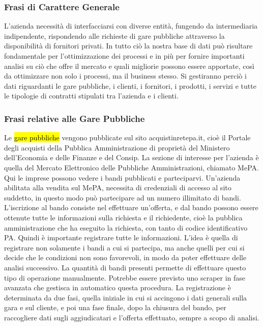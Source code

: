 
\subsubsection{Frasi di Carattere Generale}
L'azienda necessità di interfacciarsi con diverse entità, fungendo da intermediaria indipendente, rispondendo alle richieste di gare pubbliche attraverso la disponibilità di fornitori privati. In tutto ciò la nostra base di dati può risultare fondamentale per l'ottimizzazione dei processi e in più per fornire importanti analisi su ciò che offre il mercato e quali migliorie possono essere apportate, così da ottimizzare non solo i processi, ma il business stesso.\newline
Si gestiranno perciò i dati riguardanti le gare pubbliche, i clienti, i fornitori, i prodotti, i servizi e tutte le tipologie di contratti stipulati tra l'azienda e i clienti.

\subsubsection{Frasi relative alle Gare Pubbliche}
Le \hl{gare pubbliche} vengono pubblicate sul sito acquistinretepa.it, cioè il Portale degli acquisti della Pubblica Amministrazione di proprietà del Ministero dell'Economia e delle Finanze e del Consip.\newline
La sezione di interesse per l'azienda è quella del Mercato Elettronico delle Pubbliche Amministrazioni, chiamato MePA. Qui le imprese possono vedere i bandi pubblicati e parteciparvi.\newline
Un'azienda abilitata alla vendita sul MePA, necessita di credenziali di accesso al sito suddetto, in questo modo può partecipare ad un numero illimitato di bandi.\newline
L'iscrizione al bando consiste nel effettuare un'offerta, e dal bando possono essere ottenute tutte le informazioni sulla richiesta e il richiedente, cioè la pubblica amministrazione che ha eseguito la richiesta, con tanto di codice identificativo PA.\newline
Quindi è importante registrare tutte le informazioni. L'idea è quella di registrare non solamente i bandi a cui si partecipa, ma anche quelli per cui si decide che le condizioni non sono favorevoli, in modo da poter effettuare delle analisi successivo. La quantità di bandi presenti permette di effettuare questo tipo di operazione manualmente. Potrebbe essere previsto uno scraper in fase avanzata che gestisca in automatico questa procedura.\newline
La registrazione è determinata da due fasi, quella iniziale in cui si accingono i dati generali sulla gara e sul cliente, e poi una fase finale, dopo la chiusura del bando, per raccogliere dati sugli aggiudicatari e l'offerta effettuato, sempre a scopo di analisi.

